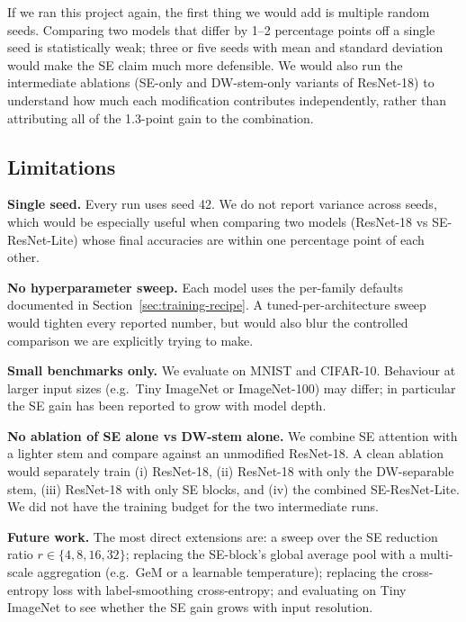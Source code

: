 \documentclass[conference,10pt]{IEEEtran}
\begin{document}
If we ran this project again, the first thing we would add is multiple
random seeds. Comparing two models that differ by 1--2 percentage
points off a single seed is statistically weak; three or five seeds
with mean and standard deviation would make the SE claim much more
defensible. We would also run the intermediate ablations (SE-only and
DW-stem-only variants of ResNet-18) to understand how much each
modification contributes independently, rather than attributing all
of the 1.3-point gain to the combination.

\subsection{Limitations}

\noindent\textbf{Single seed.} Every run uses seed 42. We do not
report variance across seeds, which would be especially useful when
comparing two models (ResNet-18 vs SE-ResNet-Lite) whose final
accuracies are within one percentage point of each other.

\noindent\textbf{No hyperparameter sweep.} Each model uses the
per-family defaults documented in
Section~\ref{sec:training-recipe}. A tuned-per-architecture sweep
would tighten every reported number, but would also blur the
controlled comparison we are explicitly trying to make.

\noindent\textbf{Small benchmarks only.} We evaluate on MNIST and
CIFAR-10. Behaviour at larger input sizes (e.g.\ Tiny ImageNet or
ImageNet-100) may differ; in particular the SE gain has been reported
to grow with model depth.

\noindent\textbf{No ablation of SE alone vs DW-stem alone.} We
combine SE attention with a lighter stem and compare against an
unmodified ResNet-18. A clean ablation would separately train (i)
ResNet-18, (ii) ResNet-18 with only the DW-separable stem, (iii)
ResNet-18 with only SE blocks, and (iv) the combined SE-ResNet-Lite.
We did not have the training budget for the two intermediate runs.

\noindent\textbf{Future work.} The most direct extensions are: a
sweep over the SE reduction ratio $r\!\in\!\{4,8,16,32\}$; replacing
the SE-block's global average pool with a multi-scale aggregation
(e.g.\ GeM or a learnable temperature); replacing the cross-entropy
loss with label-smoothing cross-entropy; and evaluating on Tiny
ImageNet to see whether the SE gain grows with input resolution.

\end{document}
